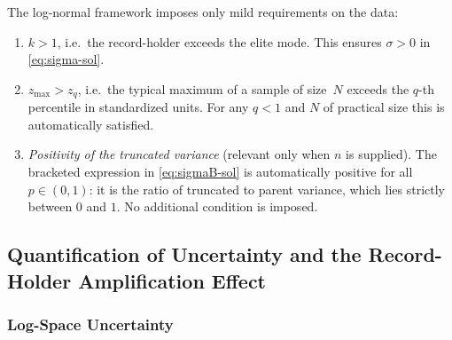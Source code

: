 \documentclass{article}
\begin{document}
The log-normal framework imposes only mild requirements on the data:
\begin{enumerate}
  \item[\textbf{C1.}]
    $k > 1$, i.e.\ the record-holder exceeds the elite mode. This
    ensures $\sigma > 0$ in \eqref{eq:sigma-sol}.
  \item[\textbf{C2.}]
    $z_{\max} > z_q$, i.e.\ the typical maximum of a sample of
    size~$N$ exceeds the $q$-th percentile in standardized units. For
    any $q < 1$ and $N$ of practical size this is automatically
    satisfied.
  \item[\textbf{C3.}]
    \emph{Positivity of the truncated variance} (relevant only when $n$
    is supplied).\;
    The bracketed expression in \eqref{eq:sigmaB-sol} is automatically
    positive for all $p \in (0,1)$: it is the ratio of truncated to
    parent variance, which lies strictly between $0$ and $1$. No
    additional condition is imposed.
\end{enumerate}

\subsection{Quantification of Uncertainty and the Record-Holder
            Amplification Effect}\label{ssec:uncertainty}

\subsubsection{Log-Space Uncertainty}
\end{document}
